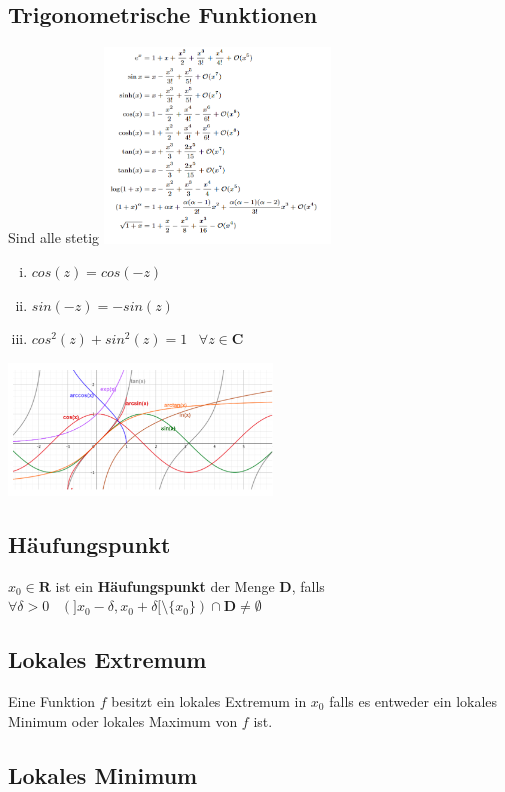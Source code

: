 \documentclass[8pt]{article}
\begin{document}
\begin{multicols*}{3}
\subsection{Trigonometrische Funktionen}
Sind alle stetig
\includegraphics[width=6cm]{taylor.png}



\begin{enumerate}[(i)]
  \item $cos(z) = cos(-z)$
  \item $sin(-z) = -sin(z)$
  \item $cos^2(z) + sin^2(z) = 1 \;\;\; \forall z \in \mathbf{C}$
\end{enumerate}
\includegraphics[width=7cm]{functions.png}

\subsection{Häufungspunkt}

$x_0 \in \mathbf{R}$ ist ein \textbf{Häufungspunkt} der Menge $\mathbf{D}$,
falls $\forall \delta > 0 \;\;\; (]x_0 - \delta, x_0 + \delta[ \setminus \{x_0\}) \cap \mathbf{D} \neq \emptyset$

\subsection{Lokales Extremum}

Eine Funktion $f$ besitzt ein lokales Extremum in $x_0$ falls es entweder ein lokales Minimum oder lokales Maximum von $f$ ist.

\subsection{Lokales Minimum}


\end{multicols*}
\end{document}
